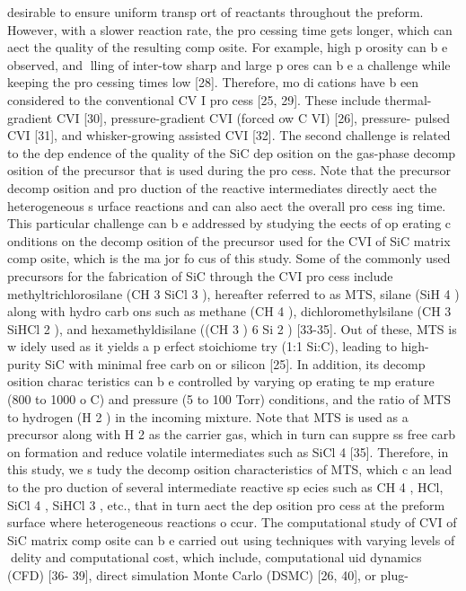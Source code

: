 \documentclass[10pt, letterpaper]{article}
\begin{document}
desirable to ensure uniform transp ort of reactants throughout the preform. However, with a slower reaction
rate, the pro cessing time gets longer, which can aect the quality of the resulting comp osite. For example,
high p orosity can b e observed, and lling of inter-tow sharp and large p ores can b e a challenge while keeping
the pro cessing times low [28]. Therefore, mo dications have b een considered to the conventional CV I pro cess
[25, 29]. These include thermal-gradient CVI [30], pressure-gradient CVI (forced 
ow C VI) [26], pressure-
pulsed CVI [31], and whisker-growing assisted CVI [32]. The second challenge is related to the dep endence
of the quality of the SiC dep osition on the gas-phase decomp osition of the precursor that is used during the
pro cess. Note that the precursor decomp osition and pro duction of the reactive intermediates directly aect
the heterogeneous s urface reactions and can also aect the overall pro cess ing time. This particular challenge
can b e addressed by studying the eects of op erating c onditions on the decomp osition of the precursor used
for the CVI of SiC matrix comp osite, which is the ma jor fo cus of this study.
Some of the commonly used precursors for the fabrication of SiC through the CVI pro cess include
methyltrichlorosilane (CH
3
SiCl
3
), hereafter referred to as MTS, silane (SiH
4
) along with hydro carb ons such
as methane (CH
4
), dichloromethylsilane (CH
3
SiHCl
2
), and hexamethyldisilane ((CH
3
)
6
Si
2
) [33-35]. Out
of these, MTS is w idely used as it yields a p erfect stoichiome try (1:1 Si:C), leading to high-purity SiC
with minimal free carb on or silicon [25]. In addition, its decomp osition charac teristics can b e controlled by
varying op erating te mp erature (800 to 1000
o
C) and pressure (5 to 100 Torr) conditions, and the ratio of
MTS to hydrogen (H
2
) in the incoming mixture. Note that MTS is used as a precursor along with H
2
as
the carrier gas, which in turn can suppre ss free carb on formation and reduce volatile intermediates such as
SiCl
4
[35]. Therefore, in this study, we s tudy the decomp osition characteristics of MTS, which c an lead to
the pro duction of several intermediate reactive sp ecies such as CH
4
, HCl, SiCl
4
, SiHCl
3
, etc., that in turn
aect the dep osition pro cess at the preform surface where heterogeneous reactions o ccur.
The computational study of CVI of SiC matrix comp osite can b e carried out using techniques with
varying levels of delity and computational cost, which include, computational 
uid dynamics (CFD) [36-
39], direct simulation Monte Carlo (DSMC) [26, 40], or plug-
\end{document}
